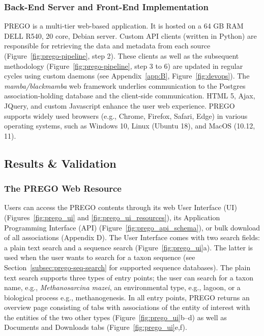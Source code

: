    \subsubsection*{Back-End Server and Front-End Implementation}
   \label{subsec:prego-back-end}

   PREGO is a multi-tier web-based application. 
   It is hosted on a 64 GB RAM DELL R540, 20 core, Debian server. 
   Custom API clients (written in Python) are responsible for retrieving the data and metadata from each source (Figure~\ref{fig:prego-pipeline}, step 2). 
   These clients as well as the subsequent methodology (Figure~\ref{fig:prego-pipeline}, step 3 to 6) are updated in regular cycles using custom daemons (see Appendix~\ref{app:B}, Figure~\ref{fig:devops}). 
   The \textit{mamba/blackmamba} web framework underlies communication to the Postgres association-holding database and the client-side communication. 
   HTML 5, Ajax, JQuery, and custom Javascript enhance the user web experience. 
   PREGO supports widely used browsers (e.g., Chrome, Firefox, Safari, Edge) in various operating systems, such as Windows 10, Linux (Ubuntu 18), and MacOS (10.12, 11).


\subsection{Results \& Validation}
\label{sec:prego-results}

   \subsubsection*{The PREGO Web Resource}
   \label{subsec:prego-web-resource}

   Users can access the PREGO contents through its web User Interface (UI) (Figures~\ref{fig:prego_ui} and \ref{fig:prego_ui_resources}), its Application Programming Interface (API) (Figure~\ref{fig:prego_api_schema}), or bulk download of all associations (Appendix D). 
   The User Interface comes with two search fields: a plain text search and a sequence search (Figure~\ref{fig:prego_ui}a). 
   The latter is used when the user wants to search for a taxon sequence (see Section~\ref{subsec:prego-seq-search} for supported sequence databases). 
   The plain text search supports three types of entry points; the user can search for a taxon name, e.g., \textit{Methanosarcina mazei}, an environmental type, e.g., lagoon, or a biological process e.g., methanogenesis. 
   In all entry points, PREGO returns an overview page consisting of tabs with associations of the entity of interest with the entities of the two other types (Figure~\ref{fig:prego_ui}b–d) as well as Documents and Downloads tabs (Figure~\ref{fig:prego_ui}e,f).


